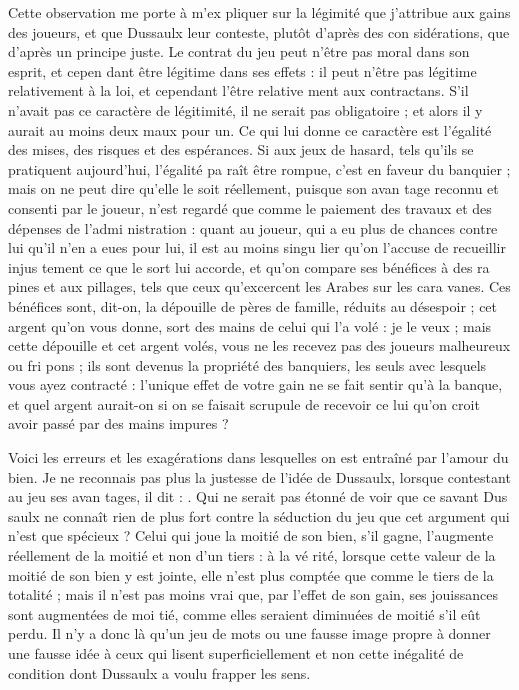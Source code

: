 Cette observation me porte à m'ex%
pliquer sur la légimité que j'attribue
aux gains des joueurs, et que Dussaulx
leur conteste, plutôt d'après des con%
sidérations, que d'après un principe
juste. Le contrat du jeu peut n'être
pas moral dans son esprit, et cepen%
dant être légitime dans ses effets : il
peut n'être pas légitime relativement
à la loi, et cependant l'être relative%
ment aux contractans. S'il n'avait pas
ce caractère de légitimité, il ne serait
pas obligatoire ; et alors il y aurait au
moins deux maux pour un. Ce qui lui
donne ce caractère est l'égalité des
mises, des risques et des espérances.
Si aux jeux de hasard, tels qu'ils se
pratiquent aujourd'hui, l'égalité pa%
raît être rompue, c'est en faveur du
banquier ; mais on ne peut dire qu'elle
le soit réellement, puisque son avan
tage reconnu et consenti par le joueur,
n'est regardé que comme le paiement
des travaux et des dépenses de l'admi%
nistration : quant au joueur, qui a eu
plus de chances contre lui qu'il n'en
a eues pour lui, il est au moins singu%
lier qu'on l'accuse de recueillir injus%
tement ce que le sort lui accorde, et
qu'on compare ses bénéfices à des ra%
pines et aux pillages, tels que ceux
qu'excercent les Arabes sur les cara%
vanes. Ces bénéfices sont, dit-on, la
dépouille de pères de famille, réduits
au désespoir ; cet argent qu'on vous
donne, sort des mains de celui qui l'a
volé : je le veux ; mais cette dépouille
et cet argent volés, vous ne les recevez
pas des joueurs malheureux ou fri%
pons ; ils sont devenus la propriété
des banquiers, les seuls avec lesquels
vous ayez contracté : l'unique effet
de votre gain ne se fait sentir qu'à la
banque, et quel argent aurait-on si
on se faisait scrupule de recevoir ce%
lui qu'on croit avoir passé par des
mains impures ?

Voici les erreurs et les exagérations
dans lesquelles on est entraîné par
l'amour du bien. Je ne reconnais pas
plus la justesse de l'idée de Dussaulx,
lorsque contestant au jeu ses avan%
tages, il dit : . Qui ne serait pas
étonné de voir que ce savant Dus%
saulx ne connaît rien de plus fort
contre la séduction du jeu que cet
argument qui n'est que spécieux ?
Celui qui joue la moitié de son bien,
s'il gagne, l'augmente réellement de
la moitié et non d'un tiers : à la vé%
rité, lorsque cette valeur de la moitié
de son bien y est jointe, elle n'est
plus comptée que comme le tiers de
la totalité ; mais il n'est pas moins
vrai que, par l'effet de son gain, ses
jouissances sont augmentées de moi%
tié, comme elles seraient diminuées
de moitié s'il eût perdu. Il n'y a donc
là qu'un jeu de mots ou une fausse
image propre à donner une fausse idée
à ceux qui lisent superficiellement et
non cette inégalité de condition dont
Dussaulx a voulu frapper les sens.


